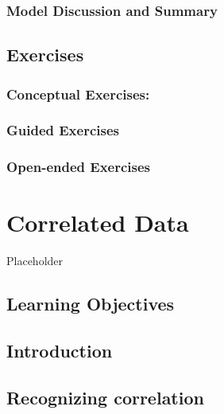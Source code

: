 \documentclass[
]{krantz}
\begin{document}
\hypertarget{model-discussion-and-summary}{%
\subsection{Model Discussion and Summary}\label{model-discussion-and-summary}}

\hypertarget{exercises-5}{%
\section{Exercises}\label{exercises-5}}

\hypertarget{conceptual-exercises-3}{%
\subsection{Conceptual Exercises:}\label{conceptual-exercises-3}}

\hypertarget{guided-exercises-3}{%
\subsection{Guided Exercises}\label{guided-exercises-3}}

\hypertarget{open-ended-exercises-2}{%
\subsection{Open-ended Exercises}\label{open-ended-exercises-2}}

\hypertarget{ch-corrdata}{%
\chapter{Correlated Data}\label{ch-corrdata}}

Placeholder

\hypertarget{learning-objectives-6}{%
\section{Learning Objectives}\label{learning-objectives-6}}

\hypertarget{introduction-1}{%
\section{Introduction}\label{introduction-1}}

\hypertarget{recognizing-correlation}{%
\section{Recognizing correlation}\label{recognizing-correlation}}
\end{document}
